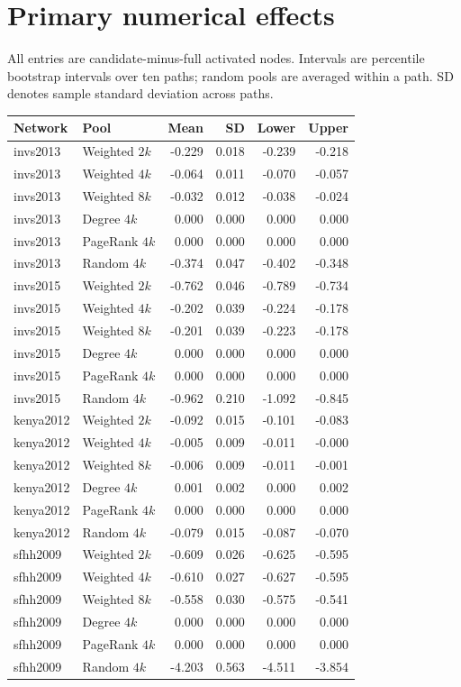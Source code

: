 \documentclass[11pt]{article}
\begin{document}
\section{Primary numerical effects}
All entries are candidate-minus-full activated nodes. Intervals are percentile bootstrap intervals over ten paths; random pools are averaged within a path. SD denotes sample standard deviation across paths.
\begin{longtable}{llrrrr}
\toprule Network & Pool & Mean & SD & Lower & Upper \\ \midrule\endhead
invs2013 & Weighted $2k$ & -0.229 & 0.018 & -0.239 & -0.218 \\
invs2013 & Weighted $4k$ & -0.064 & 0.011 & -0.070 & -0.057 \\
invs2013 & Weighted $8k$ & -0.032 & 0.012 & -0.038 & -0.024 \\
invs2013 & Degree $4k$ & 0.000 & 0.000 & 0.000 & 0.000 \\
invs2013 & PageRank $4k$ & 0.000 & 0.000 & 0.000 & 0.000 \\
invs2013 & Random $4k$ & -0.374 & 0.047 & -0.402 & -0.348 \\
invs2015 & Weighted $2k$ & -0.762 & 0.046 & -0.789 & -0.734 \\
invs2015 & Weighted $4k$ & -0.202 & 0.039 & -0.224 & -0.178 \\
invs2015 & Weighted $8k$ & -0.201 & 0.039 & -0.223 & -0.178 \\
invs2015 & Degree $4k$ & 0.000 & 0.000 & 0.000 & 0.000 \\
invs2015 & PageRank $4k$ & 0.000 & 0.000 & 0.000 & 0.000 \\
invs2015 & Random $4k$ & -0.962 & 0.210 & -1.092 & -0.845 \\
kenya2012 & Weighted $2k$ & -0.092 & 0.015 & -0.101 & -0.083 \\
kenya2012 & Weighted $4k$ & -0.005 & 0.009 & -0.011 & -0.000 \\
kenya2012 & Weighted $8k$ & -0.006 & 0.009 & -0.011 & -0.001 \\
kenya2012 & Degree $4k$ & 0.001 & 0.002 & 0.000 & 0.002 \\
kenya2012 & PageRank $4k$ & 0.000 & 0.000 & 0.000 & 0.000 \\
kenya2012 & Random $4k$ & -0.079 & 0.015 & -0.087 & -0.070 \\
sfhh2009 & Weighted $2k$ & -0.609 & 0.026 & -0.625 & -0.595 \\
sfhh2009 & Weighted $4k$ & -0.610 & 0.027 & -0.627 & -0.595 \\
sfhh2009 & Weighted $8k$ & -0.558 & 0.030 & -0.575 & -0.541 \\
sfhh2009 & Degree $4k$ & 0.000 & 0.000 & 0.000 & 0.000 \\
sfhh2009 & PageRank $4k$ & 0.000 & 0.000 & 0.000 & 0.000 \\
sfhh2009 & Random $4k$ & -4.203 & 0.563 & -4.511 & -3.854 \\
\bottomrule\end{longtable}
\end{document}
